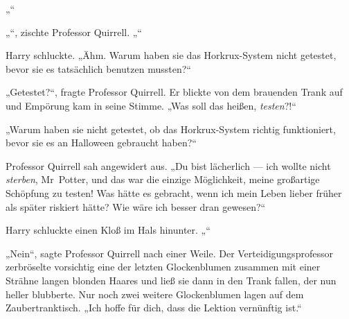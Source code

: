 „“

„“, zischte Professor Quirrell. „“

Harry schluckte.
„Ähm. Warum haben sie das Horkrux-System nicht getestet, bevor sie es tatsächlich benutzen mussten?“

„Getestet?“, fragte Professor Quirrell.
Er blickte von dem brauenden Trank auf und Empörung kam in seine Stimme.
„Was soll das heißen, \emph{testen}?!“

„Warum haben sie nicht getestet, ob das Horkrux-System richtig funktioniert, bevor sie es an Halloween gebraucht haben?“

Professor Quirrell sah angewidert aus.
„Du bist lächerlich — ich wollte nicht \emph{sterben}, Mr~Potter, und das war die einzige Möglichkeit, meine großartige Schöpfung zu testen! Was hätte es gebracht, wenn ich mein Leben lieber früher als später riskiert hätte? Wie wäre ich besser dran gewesen?“

Harry schluckte einen Kloß im Hals hinunter.
„“

„Nein“, sagte Professor Quirrell nach einer Weile.
Der Verteidigungsprofessor zerbröselte vorsichtig eine der letzten Glockenblumen zusammen mit einer Strähne langen blonden Haares und ließ sie dann in den Trank fallen, der nun heller blubberte. Nur noch zwei weitere Glockenblumen lagen auf dem Zaubertranktisch.
„Ich hoffe für dich, dass die Lektion vernünftig ist.“

